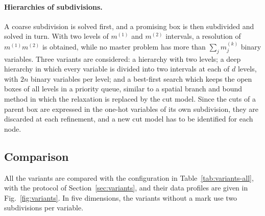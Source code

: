 \documentclass[pdflatex,sn-basic]{sn-jnl}
\newenvironment{appendices}{\appendix}{}
\begin{document}
\begin{appendices}
\paragraph{Hierarchies of subdivisions.} A coarse subdivision is solved first,
and a promising box is then subdivided and solved in turn. With two levels of
$m^{(1)}$ and $m^{(2)}$ intervals, a resolution of $m^{(1)}m^{(2)}$ is obtained,
while no master problem has more than $\sum_j m_j^{(k)}$ binary variables. Three
variants are considered: a hierarchy with two levels; a deep hierarchy in which
every variable is divided into two intervals at each of $d$ levels, with $2n$
binary variables per level; and a best-first search which keeps the open boxes of
all levels in a priority queue, similar to a spatial branch and bound method in
which the relaxation is replaced by the cut model. Since the cuts of a parent box
are expressed in the one-hot variables of its own subdivision, they are
discarded at each refinement, and a new cut model has to be identified for each
node.

\subsection{Comparison}\label{app:extensions}

All the variants are compared with the configuration in
Table~\ref{tab:variants-all}, with the protocol of Section~\ref{sec:variants},
and their data profiles are given in Fig.~\ref{fig:variants}. In five
dimensions, the variants without a mark use two subdivisions per variable.


\end{appendices}
\end{document}
